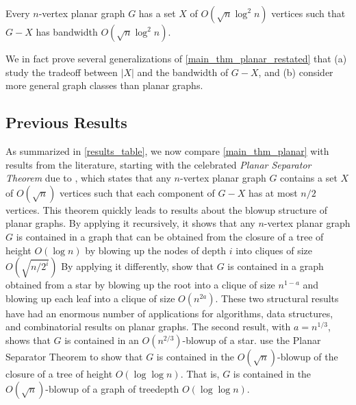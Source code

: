 \documentclass{patmorin}
\newcommand{\david}[1]{{\color{orange} David: #1}}
\newcommand{\pat}[1]{\textcolor{Blue}{Pat: #1}}
\newcommand{\defin}[1]{\emph{\textcolor{brightmaroon}{#1}}}
\begin{document}
\begin{thm}\label{main_thm_planar_restated}
  Every $n$-vertex planar graph $G$ has a set $X$ of $O(\sqrt{n}\log^2 n)$ vertices such that $G-X$ has bandwidth $O(\sqrt{n}\log^2 n)$.
\end{thm}

We in fact prove several generalizations of \cref{main_thm_planar_restated} that (a) study the tradeoff between $|X|$ and the bandwidth of $G-X$, and (b) consider more general graph classes than planar graphs.


\subsection{Previous Results}

As summarized in \cref{results_table}, we now compare \cref{main_thm_planar} with results from the literature, starting with the celebrated \defin{Planar Separator Theorem} due to \citet{lipton.tarjan:separator}, which states that any $n$-vertex planar graph $G$ contains a set $X$ of $O(\sqrt{n})$ vertices such that each component of $G-X$ has at most $n/2$ vertices. This theorem quickly leads to results about the blowup structure of planar graphs.  By applying it recursively, it shows that any $n$-vertex planar graph $G$ is contained in a graph that can be obtained from the closure of a %
tree of height $O(\log n)$ by blowing up the nodes of depth $i$ into cliques of size $O(\sqrt{n/2^i})$
By applying it differently, \citet{lipton.tarjan:applications} show that $G$ is contained in a graph obtained from a star by blowing up the root into a clique of size $n^{1-a}$ and blowing up each leaf into a clique of size $O(n^{2a})$. These two structural results have had an enormous number of applications for algorithms, data structures, and combinatorial results on planar graphs. The second result, with $a=n^{1/3}$, shows that $G$ is contained in an $O(n^{2/3})$-blowup of a star. \citet{DvoWoo} use the Planar Separator Theorem to show that $G$ is contained in the $O(\sqrt{n})$-blowup of the closure of a tree %
of height $O(\log\log n)$. That is, $G$ is contained in the $O(\sqrt{n})$-blowup of a graph of treedepth $O(\log\log n)$.
\end{document}
